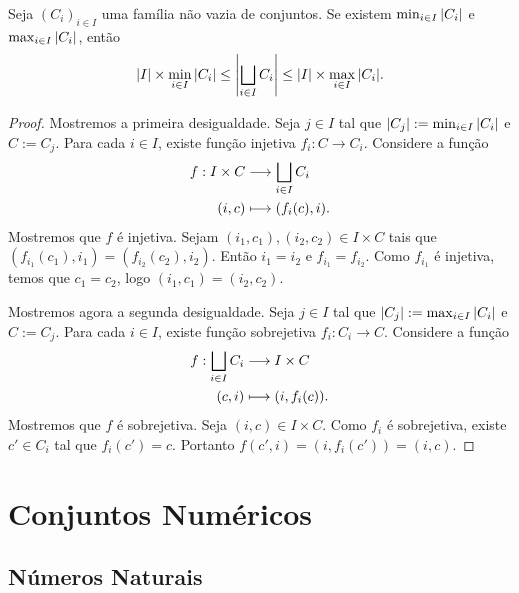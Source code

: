 \begin{teo}
Seja $(C_i)_{i \in I}$ uma família não vazia de conjuntos. Se existem $\min_{i \in I}{\left\vert{C_i}\right\vert}$ e $\max_{i \in I}{\left\vert{C_i}\right\vert}$, então
\begin{equation*}
\left\vert{I}\right\vert \times \min_{i \in I}{\left\vert{C_i}\right\vert} \leq \left\vert{\bigsqcup_{i \in I} C_i}\right\vert \leq \left\vert{I}\right\vert \times \max_{i \in I}{\left\vert{C_i}\right\vert}.
\end{equation*}
\end{teo}
\begin{proof}
Mostremos a primeira desigualdade. Seja $j \in I$ tal que $\left\vert{C_j}\right\vert := \min_{i \in I}{\left\vert{C_i}\right\vert}$ e $C := C_j$. Para cada $i \in I$, existe função injetiva $f_i: C \to C_i$. Considere a função
	\begin{align*}
	{f}: {I \times C} &\longrightarrow {\bigsqcup_{i \in I} C_i} \\{(i,c)} &\longmapsto {(f_i(c),i)}.
	\end{align*}
Mostremos que $f$ é injetiva. Sejam $(i_1,c_1),(i_2,c_2) \in I \times C$ tais que $(f_{i_1}(c_1),i_1)=(f_{i_2}(c_2),i_2)$. Então $i_1=i_2$ e $f_{i_1}=f_{i_2}$. Como $f_{i_1}$ é injetiva, temos que $c_1=c_2$, logo $(i_1,c_1)=(i_2,c_2)$.

Mostremos agora a segunda desigualdade. Seja $j \in I$ tal que $\left\vert{C_j}\right\vert := \max_{i \in I}{\left\vert{C_i}\right\vert}$ e $C := C_j$. Para cada $i \in I$, existe função sobrejetiva $f_i: C_i \to C$. Considere a função
	\begin{align*}
	{f}: {\bigsqcup_{i \in I} C_i} &\longrightarrow {I \times C} \\{(c,i)} &\longmapsto {(i,f_i(c))}.
	\end{align*}
Mostremos que $f$ é sobrejetiva. Seja $(i,c) \in I \times C$. Como $f_i$ é sobrejetiva, existe $c' \in C_i$ tal que $f_i(c')=c$. Portanto $f(c',i)=(i,f_i(c'))=(i,c)$.	
\end{proof}








\chapter{Conjuntos Numéricos}


\section{Números Naturais}

